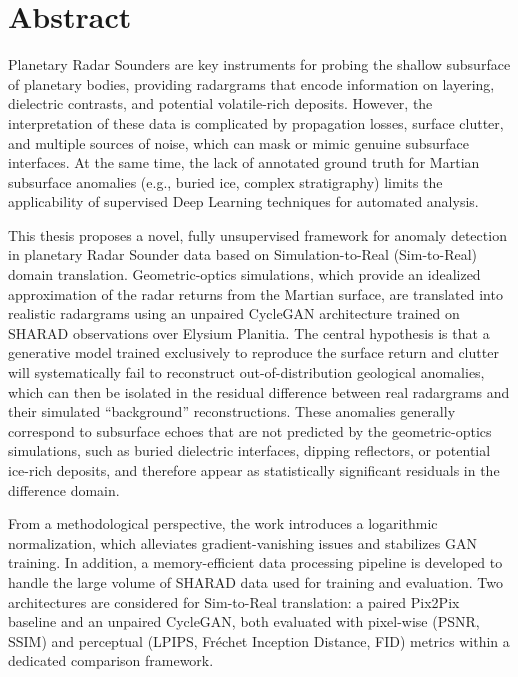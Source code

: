 \chapter*{Abstract} %
\label{abtract}

Planetary Radar Sounders are key instruments for probing the shallow subsurface of planetary bodies, providing radargrams that encode information on layering, dielectric contrasts, and potential volatile-rich deposits.
However, the interpretation of these data is complicated by propagation losses, surface clutter, and multiple sources of noise, which can mask or mimic genuine subsurface interfaces.
At the same time, the lack of annotated ground truth for Martian subsurface anomalies (e.g., buried ice, complex stratigraphy) limits the applicability of supervised Deep Learning techniques for automated analysis.

This thesis proposes a novel, fully unsupervised framework for anomaly detection in planetary Radar Sounder data based on Simulation-to-Real (Sim-to-Real) domain translation.
Geometric-optics simulations, which provide an idealized approximation of the radar returns from the Martian surface, are translated into realistic radargrams using an unpaired CycleGAN architecture trained on SHARAD observations over Elysium Planitia.
The central hypothesis is that a generative model trained exclusively to reproduce the surface return and clutter will systematically fail to reconstruct out-of-distribution geological anomalies, which can then be isolated in the residual difference between real radargrams and their simulated \enquote{background} reconstructions.
These anomalies generally correspond to subsurface echoes that are not predicted by the geometric-optics simulations, such as buried dielectric interfaces, dipping reflectors, or potential ice-rich deposits, and therefore appear as statistically significant residuals in the difference domain.

From a methodological perspective, the work introduces a logarithmic normalization, which alleviates gradient-vanishing issues and stabilizes GAN training.
In addition, a memory-efficient data processing pipeline is developed to handle the large volume of SHARAD data used for training and evaluation.
Two architectures are considered for Sim-to-Real translation: a paired Pix2Pix baseline and an unpaired CycleGAN, both evaluated with pixel-wise (PSNR, SSIM) and perceptual (LPIPS, Fréchet Inception Distance, FID) metrics within a dedicated comparison framework.

